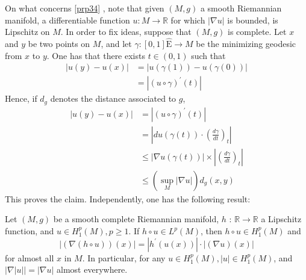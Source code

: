\documentclass[12pt,hyperref,a4paper,UTF8]{ctexart}
\begin{document}
On what concerns \autoref{prp34} , note that given $(M, g)$ a smooth Riemannian manifold, a differentiable function $u: M \rightarrow \mathbb{R}$ for which $|\nabla u|$ is bounded, is Lipschitz on $M$. In order to fix ideas, suppose that $(M, g)$ is complete. Let $x$ and $y$ be two points on $M$, and let $\gamma:[0,1] \hat{\mathrm{E}} \rightarrow M$ be the minimizing geodesic from $x$ to $y$. One has that there exists $t \in(0,1)$ such that
$$
\begin{aligned}
|u(y)-u(x)| & =|u(\gamma(1))-u(\gamma(0))| \\
& =\left|(u \circ \gamma)^{\prime}(t)\right|
\end{aligned}
$$
Hence, if $d_g$ denotes the distance associated to $g$,
$$
\begin{aligned}
|u(y)-u(x)| & =\left|(u \circ \gamma)^{\prime}(t)\right| \\
& =\left|d u(\gamma(t)) \cdot\left(\frac{d \gamma}{d t}\right)_t\right| \\
& \leq|\nabla u(\gamma(t))| \times\left|\left(\frac{d \gamma}{d t}\right)_t\right| \\
& \leq\left(\sup _M|\nabla u|\right) d_g(x, y)
\end{aligned}
$$
This proves the claim. Independently, one has the following result:

\begin{Proposition}
    Let $(M, g)$ be a smooth complete Riemannian manifold, $h$ : $\mathbb{R} \rightarrow \mathbb{R}$ a Lipschitz function, and $u \in H_1^p(M), p \geq 1$. If $h \circ u \in L^p(M)$, then $h \circ u \in H_1^p(M)$ and
$$
|(\nabla(h \circ u))(x)|=\left|h^{\prime}(u(x))\right| \cdot|(\nabla u)(x)|
$$
for almost all $x$ in $M$. In particular, for any $u \in H_1^p(M),|u| \in H_1^p(M)$, and $|\nabla| u||=|\nabla u|$ almost everywhere.
\label{prp35}
\end{Proposition}
\end{document}

